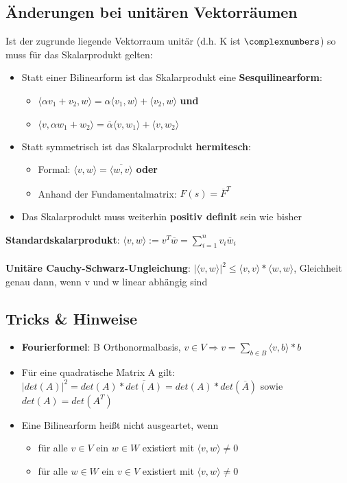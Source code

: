 \subsection{Änderungen bei unitären Vektorräumen}%
\label{sp:sub:aenderungen_bei_unitaeren_vektorraeumen}

Ist der zugrunde liegende Vektorraum unitär (d.h. K ist $\complexnumbers$) so muss für das Skalarprodukt gelten:
\begin{itemize}
	\item Statt einer Bilinearform ist das Skalarprodukt eine \textbf{Sesquilinearform}:
	\begin{itemize}
		\item $\langle \alpha v_1 + v_2, w\rangle = \alpha\langle  v_1, w\rangle + \langle v_2, w\rangle$ \textbf{und}
		\item $\langle v, \alpha w_1 + w_2\rangle = \overline{\alpha}\langle  v, w_1\rangle + \langle v, w_2\rangle$
	\end{itemize}
	\item Statt symmetrisch ist das Skalarprodukt \textbf{hermitesch}:
		\begin{itemize}
			\item Formal: $\langle v, w\rangle = \overline{\langle w, v\rangle}$ \textbf{oder}
			\item Anhand der Fundamentalmatrix: $F(s) = \overline{F}^T$
		\end{itemize}
	\item Das Skalarprodukt muss weiterhin \textbf{positiv definit} sein wie bisher
\end{itemize}
\textbf{Standardskalarprodukt}: $\langle v, w\rangle := v^T\overline{w} = \sum_{i = 1}^{n} v_i\overline{w}_i$\\\\
\textbf{Unitäre Cauchy-Schwarz-Ungleichung}: $|\langle v, w\rangle|^2 \leq \langle v, v\rangle * \langle w, w\rangle$, Gleichheit genau dann, wenn v und w linear abhängig sind

\subsection{Tricks \& Hinweise}%
\label{sp:sub:tricks_hinweise}

\begin{itemize}
	\item \textbf{Fourierformel}: B Orthonormalbasis, $v \in V \Rightarrow v = \sum_{b \in B} \langle v, b\rangle * b$
	\item Für eine quadratische Matrix A gilt: $|det(A)|^2 = det(A) * \overline{det(A)} = det(A) * det(\overline{A})$ sowie $det(A) = det(A^T)$
	\item Eine Bilinearform heißt nicht ausgeartet, wenn
	\begin{itemize}
		\item für alle $v \in V$ ein $w \in W$ existiert mit $\langle v, w\rangle \neq 0$
		\item für alle $w \in W$ ein $v \in V$ existiert mit $\langle v, w\rangle \neq 0$
	\end{itemize}
\end{itemize}